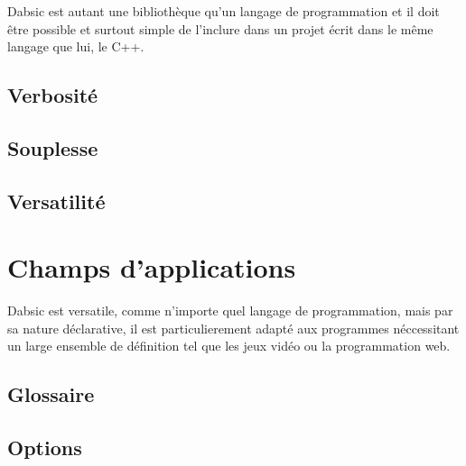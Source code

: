 \documentclass[a5paper, 12pt]{book}
\begin{document}
Dabsic est autant une bibliothèque qu'un langage de programmation
et il doit être possible et surtout simple de l'inclure dans
un projet écrit dans le même langage que lui, le C++.

\chapter{Verbosité}

\chapter{Souplesse}

\chapter{Versatilité}


\part{Champs d'applications}

Dabsic est versatile, comme n'importe quel langage de programmation,
mais par sa nature déclarative, il est particulierement adapté
aux programmes néccessitant un large ensemble de définition tel
que les jeux vidéo ou la programmation web.

\appendix

\chapter{Glossaire}

\chapter{Options}
\end{document}
